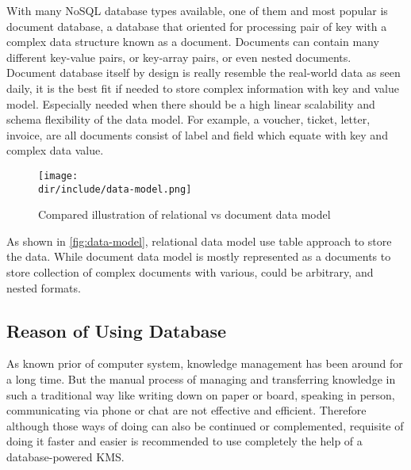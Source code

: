 With many \ac{NoSQL} database types available, one of them and most popular is document database, a database that oriented for processing pair of  key with a complex data structure known as a document.
Documents can contain many different key-value pairs, or key-array pairs, or even nested documents.~\autocite{MongoDB:2015:NoSQL}
Document database itself by design is really resemble the real-world data as seen daily, it is the best fit if needed to store complex information with key and value model.
Especially needed when there should be a high linear scalability and schema flexibility of the data model.
For example, a voucher, ticket, letter, invoice, are all documents consist of label and field which equate with key and complex data value.

\begin{figure}[htbp]
    \centering
    \texttt{[image: \\dir/include/data-model.png]}
    \caption[Relational vs Document Data Model]{Compared illustration of relational vs document data model}
    \label{fig:data-model}
\end{figure}

As shown in \autoref{fig:data-model}, relational data model use table approach to store the data.
While document data model is mostly represented as a documents to store collection of complex documents with various, could be arbitrary, and nested formats.

\subsection{Reason of Using Database}
\label{ssec:reason-db}

As known prior of computer system, knowledge management has been around for a long time.
But the manual process of managing and transferring knowledge in such a traditional way like writing down on paper or board, speaking in person, communicating via phone or chat are not effective and efficient.
Therefore although those ways of doing can also be continued or complemented, requisite of doing it faster and easier is recommended to use completely the help of a database-powered \ac{KMS}.
